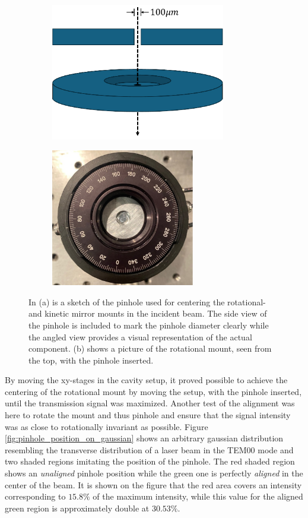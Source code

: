 \begin{figure}[h!]
    \centering
    \begin{subfigure}[b]{0.49\textwidth}
        \centering
        \includegraphics[height=6cm]{figures/pinhole_sketch.pdf}
        \caption{}
        \label{fig:pinhole_sketch}
    \end{subfigure}
    \hfill
    \begin{subfigure}[b]{0.49\textwidth}
        \centering
        \includegraphics[height=6cm]{figures/pinhole_picture.pdf}
        \caption{}
        \label{fig:pinhole_picture}
    \end{subfigure}
    \caption{In (a) is a sketch of the pinhole used for centering the rotational- and kinetic mirror mounts in the incident beam. The side view of the pinhole is included to mark the pinhole diameter clearly while the angled view provides a visual representation of the actual component. (b) shows a picture of the rotational mount, seen from the top, with the pinhole inserted.}
    \label{fig:pinhole_sketch_and_picture}
\end{figure}

By moving the xy-stages in the cavity setup, it proved possible to achieve the centering of the rotational mount by moving the setup, with the pinhole inserted, until the transmission signal was maximized. Another test of the alignment was here to rotate the mount and thus pinhole and ensure that the signal intensity was as close to rotationally invariant as possible. Figure \ref{fig:pinhole_position_on_gaussian} shows an arbitrary gaussian distribution resembling the transverse distribution of a laser beam in the TEM00 mode and two shaded regions imitating the position of the pinhole. The red shaded region shows an \emph{unaligned} pinhole position while the green one is perfectly \emph{aligned} in the center of the beam. It is shown on the figure that the red area covers an intensity corresponding to $15.8\%$ of the maximum intensity, while this value for the aligned green region is approximately double at $30.53\%$.


